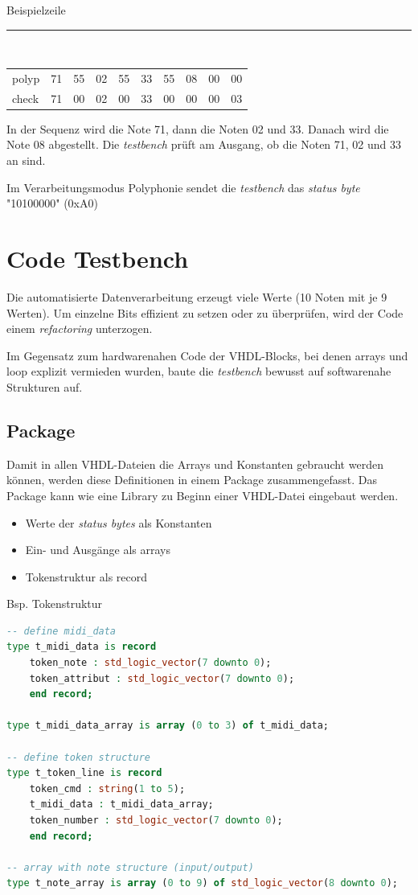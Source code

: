 Beispielzeile\\
\rule{\textwidth}{0.4pt}\\
{
\renewcommand{\arraystretch}{1.0} %
\begin{tabular*}{\textwidth}{@{}@{\extracolsep{\fill}}*{10}{l}@{}} %
polyp & 71 & 55 & 02 & 55 & 33 & 55 & 08 & 00 & 00\\
check & 71 & 00 & 02 & 00 & 33 & 00 & 00 & 00 & 03
\end{tabular*}
}

In der Sequenz wird die Note 71, dann die Noten 02 und 33. Danach wird die Note 08 abgestellt. Die \textit{testbench} prüft am Ausgang, ob die Noten 71, 02 und 33 an sind. 

Im Verarbeitungsmodus Polyphonie sendet die \textit{testbench}  das \textit{status byte} "10100000" (0xA0) 



\section{Code Testbench}\label{sec.code_testbench}
Die automatisierte Datenverarbeitung erzeugt viele Werte (10 Noten mit je 9 Werten). Um einzelne Bits effizient zu setzen oder zu überprüfen, wird der Code einem \textit{refactoring} unterzogen.

Im Gegensatz zum hardwarenahen Code der VHDL-Blocks, bei denen arrays und loop explizit vermieden wurden, baute die \textit{testbench} bewusst auf softwarenahe Strukturen auf.

\subsection{Package}
Damit in allen VHDL-Dateien die Arrays und Konstanten gebraucht werden können, werden diese Definitionen in einem Package zusammengefasst. Das Package kann wie eine Library zu Beginn einer VHDL-Datei eingebaut werden.
\begin{itemize}
	\item Werte der \textit{status bytes} als Konstanten
	\item Ein- und Ausgänge als arrays
	\item Tokenstruktur als record
\end{itemize}

Bsp. Tokenstruktur

\begin{lstlisting}[language=vhdl]
-- define midi_data
type t_midi_data is record
    token_note : std_logic_vector(7 downto 0);
    token_attribut : std_logic_vector(7 downto 0);
    end record;

type t_midi_data_array is array (0 to 3) of t_midi_data;

-- define token structure
type t_token_line is record
    token_cmd : string(1 to 5);
    t_midi_data : t_midi_data_array;
    token_number : std_logic_vector(7 downto 0);
    end record;

-- array with note structure (input/output)
type t_note_array is array (0 to 9) of std_logic_vector(8 downto 0);
\end{lstlisting}


